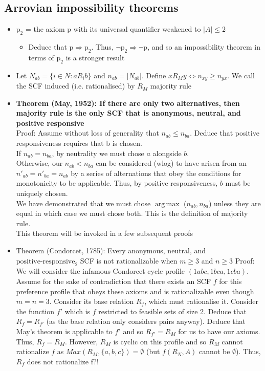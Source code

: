 \documentclass[20pt,a4paper,landscape]{extarticle}
\DeclareMathOperator*{\argmax}{arg\,max\:}
\begin{document}
\begin{flushleft}
\subsection{Arrovian impossibility theorems}
\begin{itemize}
\item $\textrm{p}_2$ = the axiom $\textrm{p}$ with its universal quantifier weakened to $|A| \leq 2$
    \begin{itemize}
    \item Deduce that $\textrm{p} \Rightarrow \textrm{p}_2$. Thus, $\neg\textrm{p}_2 \Rightarrow \neg\textrm{p}$, and so an impossibility theorem in terms of $\textrm{p}_2$ is a stronger result
    \end{itemize}
\item Let $N_{ab} = \{i \in N: aR_ib\}$ and $n_{ab} = |N_{ab}|$. Define $x R_M y \Leftrightarrow n_{xy} \geq n_{yx}$. We call the SCF induced (i.e. rationalised) by $R_M$ majority rule
\item \textbf{Theorem (May, 1952): If there are only two alternatives, then majority rule is the only SCF that is anonymous, neutral, and positive responsive}\\
Proof: Assume without loss of generality that $n_{ab} \leq n_{ba}$. Deduce that positive responsiveness requires that b is chosen.\\
If $n_{ab} = n_{ba}$, by neutrality we must chose $a$ alongside $b$.\\
Otherwise, our $n_{ab} < n_{ba}$ can be considered (wlog) to have arisen from an $n'_{ab} = n'_{ba} = n_{ab}$ by a series of alternations that obey the conditions for monotonicity to be applicable. Thus, by positive responsiveness, $b$ must be uniquely chosen.\\
We have demonstrated that we must chose $\argmax$($n_{ab}, n_{ba}$) unless they are equal in which case we must chose both. This is the definition of majority rule.\\
This theorem will be invoked in a few subsequent proofs
\clearpage
\item Theorem (Condorcet, 1785): Every anonymous, neutral, and $\textrm{positive-responsive}_2$ SCF is not rationalizable when $m \geq 3$ and $n \geq 3$
Proof: We will consider the infamous Condorcet cycle profile $(1abc, 1bca, 1cba)$. Assume for the sake of contradiction that there exists an SCF $f$ for this preference profile that obeys these axioms and is rationalizable even though $m = n = 3$. Consider its base relation $R_f$, which must rationalise it. Consider the function $f'$ which is $f$ restricted to feasible sets of size 2. Deduce that $R_f = R_{f'}$ (as the base relation only considers pairs anyway). Deduce that May's theorem is applicable to $f'$ and so $R_{f'} = R_M$ for us to have our axioms. Thus, $R_f = R_M$. However, $R_M$ is cyclic on this profile and so $R_M$ cannot rationalize $f$ as $Max(R_M, \{a, b, c\}) = \emptyset$ (but $f(R_N, A)$ cannot be $\emptyset$). Thus, $R_f$ does not rationalize f?!

\end{itemize}
\end{flushleft}
\end{document}
